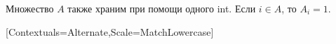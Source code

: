 Множество $A$ также храним при помощи одного int. Если $i ∈ A$, то $A_i = 1$.
\begin{multicols*}{2}
    \setlength{\columnseprule}{0.2pt}
    \setmonofont{Fira Code}[Contextuals=Alternate,Scale=MatchLowercase]
    \fontsize{9pt}{10.5pt}

    \makeatletter
        \let\FV@ListProcessLine@NoBreak@Orig\FV@ListProcessLine@NoBreak
        \let\FV@ListProcessLine@Break@Orig\FV@ListProcessLine@Break
        \def\FV@ListProcessLine@NoBreak#1{%
          \ifx\FV@Line\empty
            \hbox{}\vspace{\dimexpr-\baselineskip+7pt}%
          \else
            \FV@ListProcessLine@NoBreak@Orig{#1}%
          \fi}
        \def\FV@ListProcessLine@Break#1{%
          \ifx\FV@Line\empty
            \hbox{}\vspace{\dimexpr-\baselineskip+7pt}%
          \else
            \FV@ListProcessLine@Break@Orig{#1}%
          \fi}
    \makeatother
    \inputminted[mathescape,breaklines,python3,tabsize=2]{python}{ReedMuller.py}
\end{multicols*}
\restoregeometry
